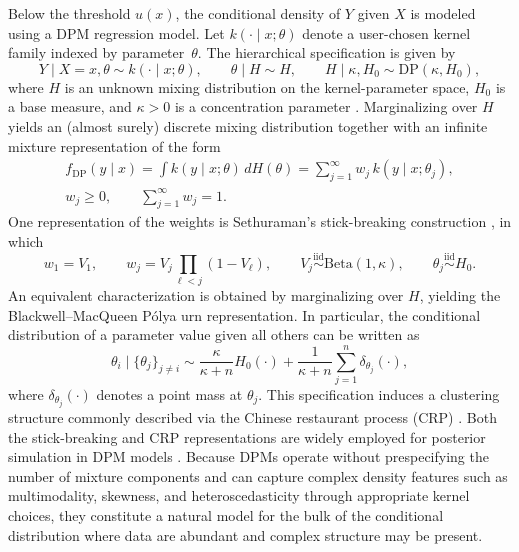 \documentclass[preprint,12pt,authoryear]{elsarticle}
\begin{document}
Below the threshold $u(x)$, the conditional density of $Y$ given $X$
is modeled using a DPM regression model.  Let
$k(\cdot\mid x;\theta)$ denote a user-chosen kernel family indexed by
parameter~$\theta$.  The hierarchical specification is given by
\begin{equation*}
Y \mid X=x,\theta \sim k(\cdot\mid x;\theta),
\qquad
\theta \mid H \sim H,
\qquad
H \mid \kappa,H_0 \sim \mathrm{DP}(\kappa,H_0),
\end{equation*}
where $H$ is an unknown mixing distribution on the kernel-parameter
space, $H_0$ is a base measure, and $\kappa>0$ is a concentration
parameter \citep{Ferguson1973}.  Marginalizing over $H$ yields an
(almost surely) discrete mixing distribution together with an infinite
mixture representation of the form
\begin{equation*}
\begin{gathered}
f_{\mathrm{DP}}(y\mid x)
=
\int k(y\mid x;\theta)\,dH(\theta)
=
\sum_{j=1}^{\infty} w_j\,k(y\mid x;\theta_j),\\
w_j\ge 0,
\qquad
\sum_{j=1}^{\infty} w_j=1.
\end{gathered}
\end{equation*}
One representation of the weights is Sethuraman's stick-breaking
construction \citep{Sethuraman1994}, in which
\begin{equation}
w_1=V_1,
\qquad
w_j=V_j\prod_{\ell<j}(1-V_\ell),
\qquad
V_j \stackrel{\mathrm{iid}}{\sim}\mathrm{Beta}(1,\kappa),
\qquad
\theta_j \stackrel{\mathrm{iid}}{\sim} H_0.
\label{eq:sb}
\end{equation}
An equivalent characterization is obtained by marginalizing over $H$,
yielding the Blackwell--MacQueen P\'olya urn representation.  In
particular, the conditional distribution of a parameter value given all
others can be written as
\begin{equation*}
\theta_i \mid \{\theta_j\}_{j \neq i}
\sim
\frac{\kappa}{\kappa+n} H_0(\cdot)
+
\frac{1}{\kappa+n}\sum_{j=1}^{n}\delta_{\theta_j}(\cdot),
\end{equation*}
where $\delta_{\theta_j}(\cdot)$ denotes a point mass at $\theta_j$.
This specification induces a clustering structure commonly described
via the Chinese restaurant process (CRP) \citep{Neal2000}.  Both the
stick-breaking and CRP representations are widely employed for
posterior simulation in DPM models
\citep{EscobarWest1995,Neal2000}.  Because DPMs operate without
prespecifying the number of mixture components and can capture complex
density features such as multimodality, skewness, and
heteroscedasticity through appropriate kernel choices, they constitute
a natural model for the bulk of the conditional distribution where data
are abundant and complex structure may be present.
\end{document}
